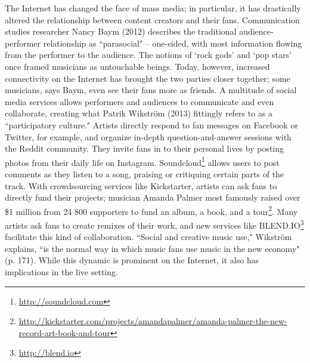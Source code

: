 The Internet has changed the face of mass media; in particular, it has drastically altered the relationship between content creators and their fans. Communication studies researcher Nancy Baym (2012) describes the traditional audience-performer relationship as ``parasocial" -- one-sided, with most information flowing from the performer to the audience. The notions of `rock gods' and `pop stars' once framed musicians as untouchable beings. Today, however, increased connectivity on the Internet has brought the two parties closer together; some musicians, says Baym, even see their fans more as friends. A multitude of social media services allows performers and audiences to communicate and even collaborate, creating what Patrik Wikstr\"{o}m (2013) fittingly refers to as a ``participatory culture." Artists directly respond to fan messages on Facebook or Twitter, for example, and organize in-depth question-and-answer sessions with the Reddit community. They invite fans in to their personal lives by posting photos from their daily life on Instagram. Soundcloud\footnote{\url{http://soundcloud.com}} allows users to post comments as they listen to a song, praising or critiquing certain parts of the track. With crowdsourcing services like Kickstarter, artists can ask fans to directly fund their projects; musician Amanda Palmer most famously raised over \$1 million from 24 800 supporters to fund an album, a book, and a tour\footnote{\url{http://kickstarter.com/projects/amandapalmer/amanda-palmer-the-new-record-art-book-and-tour}}. Many artists ask fans to create remixes of their work, and new services like BLEND.IO\footnote{\url{http://blend.io}} facilitate this kind of collaboration. ``Social and creative music use," Wikstr\"{o}m explains, ``is the normal way in which music fans use music in the new economy" (p. 171). While this dynamic is prominent on the Internet, it also has implications in the live setting.

